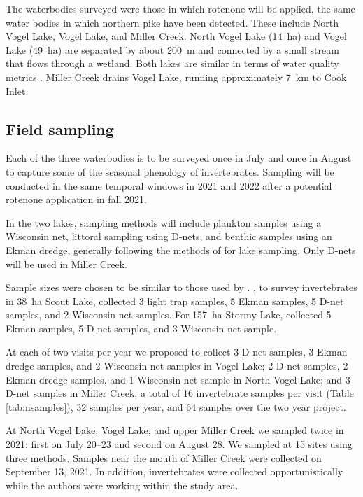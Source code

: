 \begin{multicols}{2}
The waterbodies surveyed were those in which rotenone will be applied, the same water bodies in which northern pike have been detected. These include North Vogel Lake, Vogel Lake, and Miller Creek. North Vogel Lake (14~ha) and Vogel Lake (49~ha) are separated by about 200~m and connected by a small stream that flows through a wetland. Both lakes are similar in terms of water quality metrics \citep{Meyer2021}. Miller Creek drains Vogel Lake, running approximately 7~km to Cook Inlet.

\subsection{Field sampling}

Each of the three waterbodies is to be surveyed once in July and once in August to capture some of the seasonal phenology of invertebrates. Sampling will be conducted in the same temporal windows in 2021 and 2022 after a potential rotenone application in fall 2021.

In the two lakes, sampling methods will include plankton samples using a Wisconsin net, littoral sampling using D-nets, and benthic samples using an Ekman dredge, generally following the methods of \citet{Massengill2014, Massengill2017} for lake sampling. Only D-nets will be used in Miller Creek.

Sample sizes were chosen to be similar to those used by \citet{Massengill2014, Massengill2017}. \citet{Massengill2014}, to survey invertebrates in 38~ha Scout Lake, collected 3 light trap samples, 5 Ekman samples, 5 D-net samples, and 2 Wisconsin net samples. For 157~ha Stormy Lake, \citet{Massengill2014, Massengill2017} collected 5 Ekman samples, 5 D-net samples, and 3 Wisconsin net sample.

At each of two visits per year we proposed to collect 3 D-net samples, 3 Ekman dredge samples, and 2 Wisconsin net samples in Vogel Lake; 2 D-net samples, 2 Ekman dredge samples, and 1 Wisconsin net sample in North Vogel Lake; and 3 D-net samples in Miller Creek, a total of 16 invertebrate samples per visit (Table \ref{tab:nsamples}), 32 samples per year, and 64 samples over the two year project. 


At North Vogel Lake, Vogel Lake, and upper Miller Creek we sampled twice in 2021: first on July 20--23 and second on August 28. We sampled at 15 sites using three methods. Samples near the mouth of Miller Creek were collected on September 13, 2021. In addition, invertebrates were collected opportunistically while the authors were working within the study area. 


\end{multicols}
